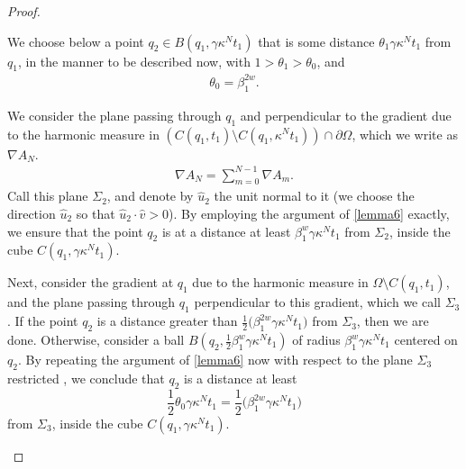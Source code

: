 \documentclass{article}
\newcounter{lem}
\theoremstyle{plain}
\theoremstyle{plain}
\theoremstyle{definition}
\theoremstyle{plain}
\begin{document}
\begin{proof}
\begin{itemize}



We choose below a point $q_2 \in B(q_1,\gamma \kappa^N t_1)$ that is some distance
$\theta_1 \gamma \kappa^N t_1$ from $q_1$, in the manner to be described now, with $1 > \theta_1 > \theta_0$, and
\begin{align}\label{eq45}
\theta_0 = \beta_1^{2w}.
\end{align}

We consider the plane passing through $q_1$ and perpendicular to the gradient due to the harmonic measure in $(C(q_1,t_1)\setminus C(q_1,\kappa^N t_1)) \cap \partial\Omega$,  which we write as $\nabla A_N$.
\begin{align}
\nabla A_N=  \sum_{m=0}^{N-1} \nabla A_m.
\end{align}
Call this plane $\Sigma_{2}$, and denote by $\hat u_{2}$ the unit normal to it
(we choose the direction $\hat u_{2}$ so that $\hat u_{2}\cdot \hat v > 0$).
By employing the argument of \cref{lemma6} exactly, we ensure that the point $q_2$ is at a
distance at least $\beta_1^{w}\gamma \kappa^N t_1$ from $\Sigma_{2}$, inside the cube $C(q_1,\gamma\kappa^N t_1)$.
 
Next, consider the gradient at $q_1$ due to the harmonic measure in $\Omega \setminus C(q_1, t_1)$, and the plane passing through $q_1$ perpendicular to this gradient, which we call $\Sigma_3$. If the point $q_2$ is a distance greater than $\frac{1}{2}\bigl(\beta_1^{2w}\gamma \kappa^N t_1\bigr)$ from $\Sigma_3$, then we are done. Otherwise, consider a ball $B(q_2, \frac{1}{2}\beta_1^{w}\gamma \kappa^N t_1)$ of radius $\beta_1^{w}\gamma \kappa^N t_1$ centered on $q_2$. By repeating the argument of \cref{lemma6} now with respect to the plane $\Sigma_3$ restricted , we conclude that $q_2$ is a distance at least
\[
\frac{1}{2}\theta_0 \gamma \kappa^N t_1 =\frac{1}{2}\bigl(\beta_1^{2w}\gamma \kappa^N t_1\bigr)
\]
from $\Sigma_3$, inside the cube $C(q_1,\gamma\kappa^N t_1)$.


\end{itemize}
\end{proof}
\end{document}
